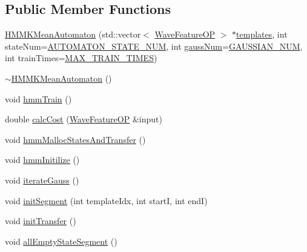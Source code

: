 \subsection*{Public Member Functions}
\begin{DoxyCompactItemize}
\item 
\hyperlink{class_h_m_m_k_mean_automaton_a8a0788b8b6dabaecee663e15fca35d04}{H\+M\+M\+K\+Mean\+Automaton} (std\+::vector$<$ \hyperlink{class_wave_feature_o_p}{Wave\+Feature\+O\+P} $>$ $\ast$\hyperlink{class_h_m_m_automaton_a9932eb5aa8ff484ac2406f98498595cf}{templates}, int state\+Num=\hyperlink{configure__hmm_8h_aa9cc71cb42394379957677c761aae79e}{A\+U\+T\+O\+M\+A\+T\+O\+N\+\_\+\+S\+T\+A\+T\+E\+\_\+\+N\+U\+M}, int \hyperlink{pro6__demo_8cpp_a923ffcfa3c56ccdba17bc4e700247d54}{gauss\+Num}=\hyperlink{configure__hmm_8h_a8f9db0624fff0b17f641785bb8d66a82}{G\+A\+U\+S\+S\+I\+A\+N\+\_\+\+N\+U\+M}, int train\+Times=\hyperlink{configure__hmm_8h_a52e22519b5a37e58632e9183d5197b86}{M\+A\+X\+\_\+\+T\+R\+A\+I\+N\+\_\+\+T\+I\+M\+E\+S})
\item 
\hyperlink{class_h_m_m_k_mean_automaton_aff941d0dd58e9ca9bc5aad82f8e1f081}{$\sim$\+H\+M\+M\+K\+Mean\+Automaton} ()
\item 
void \hyperlink{class_h_m_m_k_mean_automaton_a1123c813c91a51bf9d2b9ad9043bbdf8}{hmm\+Train} ()
\item 
double \hyperlink{class_h_m_m_k_mean_automaton_a65df5f2b00684dc7dbfd14f5980ce5b9}{calc\+Cost} (\hyperlink{class_wave_feature_o_p}{Wave\+Feature\+O\+P} \&input)
\item 
void \hyperlink{class_h_m_m_k_mean_automaton_a9aecd65316ff521abed2ec0eb291f27a}{hmm\+Malloc\+States\+And\+Transfer} ()
\item 
void \hyperlink{class_h_m_m_k_mean_automaton_aa95d52fcb3f1e1ce6298e531d709e805}{hmm\+Initilize} ()
\item 
void \hyperlink{class_h_m_m_k_mean_automaton_a7986907c7fb6c7e94ab3e8e8739ff340}{iterate\+Gauss} ()
\item 
void \hyperlink{class_h_m_m_k_mean_automaton_a4c76f84ca4f618311d299a96f0877394}{init\+Segment} (int template\+Idx, int start\+I, int end\+I)
\item 
void \hyperlink{class_h_m_m_k_mean_automaton_a98247e299f3d9feb8ac2a13a1ad243f0}{init\+Transfer} ()
\item 
void \hyperlink{class_h_m_m_k_mean_automaton_a7b56f990d725bd0e8c872e71fb64989f}{all\+Empty\+State\+Segment} ()
\end{DoxyCompactItemize}
